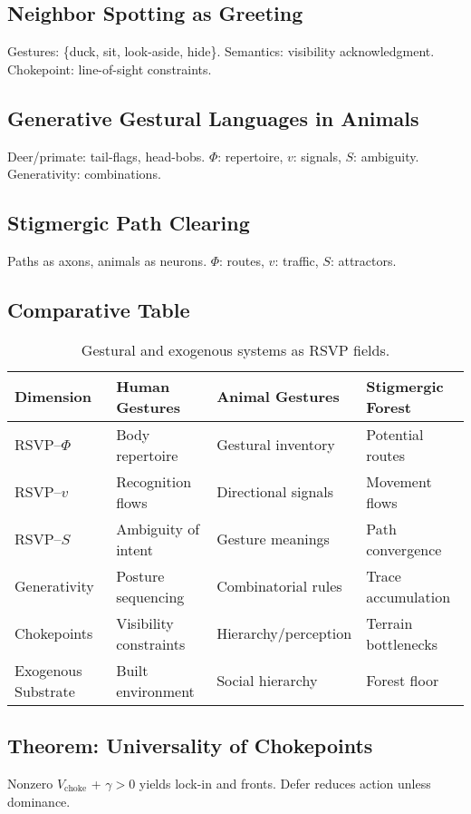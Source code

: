 \documentclass[12pt]{article}
\theoremstyle{remark}
\begin{document}
\subsection{Neighbor Spotting as Greeting}
Gestures: \{duck, sit, look-aside, hide\}. Semantics: visibility acknowledgment. Chokepoint: line-of-sight constraints.

\subsection{Generative Gestural Languages in Animals}
Deer/primate: tail-flags, head-bobs. $\Phi$: repertoire, $v$: signals, $S$: ambiguity. Generativity: combinations.

\subsection{Stigmergic Path Clearing}
Paths as axons, animals as neurons. $\Phi$: routes, $v$: traffic, $S$: attractors.

\subsection{Comparative Table}
\renewcommand{\arraystretch}{1.3}
\begin{table}[h!]
\centering
\begin{tabular}{|l|p{4cm}|p{4cm}|p{4cm}|}
\hline
Dimension & Human Gestures & Animal Gestures & Stigmergic Forest \\
\hline
RSVP--$\Phi$ & Body repertoire & Gestural inventory & Potential routes \\
RSVP--$v$ & Recognition flows & Directional signals & Movement flows \\
RSVP--$S$ & Ambiguity of intent & Gesture meanings & Path convergence \\
Generativity & Posture sequencing & Combinatorial rules & Trace accumulation \\
Chokepoints & Visibility constraints & Hierarchy/perception & Terrain bottlenecks \\
Exogenous Substrate & Built environment & Social hierarchy & Forest floor \\
\hline
\end{tabular}
\caption{Gestural and exogenous systems as RSVP fields.}
\end{table}

\subsection{Theorem: Universality of Chokepoints}
Nonzero $V_{\text{choke}}$ + $\gamma > 0$ yields lock-in and fronts. Defer reduces action unless dominance.



\end{document}
